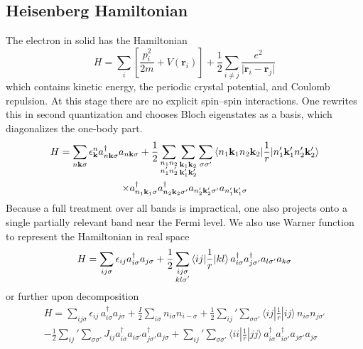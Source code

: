 \documentclass[../../../main.tex]{subfiles}
\begin{document}
\subsection{Heisenberg Hamiltonian}
The electron in solid has the Hamiltonian
\begin{equation*}
    H = \sum_{i}\left[\frac{p_i^2}{2m}+V(\mathbf{r}_i)\right]+\frac{1}{2}\sum_{i\neq j}\frac{e^2}{\lvert\mathbf{r}_i-\mathbf{r}_j\rvert}
\end{equation*}
which contains kinetic energy, the periodic crystal potential, and Coulomb repulsion. At this stage there are no explicit spin–spin interactions.
One rewrites this in second quantization and chooses Bloch eigenstates as a basis, which diagonalizes the one-body part.
\begin{multline*}
    H = \sum_{n\mathbf{k}  \sigma} \epsilon_{\mathbf{k }} ^{n} a^\dagger_{n\mathbf{k}  \sigma} a_{n \mathbf{k} \sigma} +   \frac{1}{2}\sum_{\substack{n_1 n_2                                                                                                                             \\ n_1' n_2'}}\sum_{\substack{\mathbf{k}_1 \mathbf{k}_2 \\ \mathbf{k}_1' \mathbf{k}_2'}}\sum_{\sigma\sigma'}
    \braket{n_1 \mathbf{k}_1  n_2 \mathbf{k}_2  | \frac{1}{r} |  n_1' \mathbf{k}_1' n_2'\mathbf{k}_2'   }\\
    \times     a^\dagger_{n_1\mathbf{k}_1  \sigma} a^\dagger_{n_2 \mathbf{k}_2  \sigma'} a_{ n_2'\mathbf{k}_2'  \sigma'}a_{n_1' \mathbf{k}_1'  \sigma}
\end{multline*}
Because a full treatment over all bands is impractical, one also projects onto a single partially relevant band near the Fermi level.
We also use Warner function to represent the Hamiltonian in real space
\begin{equation*}
    H =  \sum_{ij \sigma} \epsilon_{ij} a ^\dagger_{i \sigma} a_{j \sigma}  +
    \frac{1}{2}\sum_{\substack{i j \sigma \\ k l \sigma'}}
    \braket{ i   j  | \frac{1}{r} |   k l   }
    a^\dagger_{ i  \sigma} a^\dagger_{  j  \sigma'} a_{l  \sigma'}a_{  k  \sigma}
\end{equation*}
or further upon decomposition
\begin{multline*}
    H = \sum_{ij\sigma} \epsilon_{ij}\,a_{i\sigma}^{\dagger}a_{j\sigma}
    + \frac{I}{2}\sum_{i\sigma}n_{i\sigma}n_{i-\sigma}
    + \frac{1}{2}\sum_{ij}^{ }{} '  \sum_{\sigma\sigma'}\langle ij|\frac{1}{r}|ij\rangle\,n_{i\sigma}n_{j\sigma'}\\
    -\frac{1}{2}\sum_{ij}{}' \sum_{\sigma\sigma'}J_{ij}a_{i\sigma}^{\dagger}a_{i\sigma'}a_{j\sigma'}^{\dagger}a_{j\sigma}
    + \sum_{ij} {} ' \sum_{\sigma\sigma'}\langle ii|\frac{1}{r}|jj\rangle\,a_{i\sigma}^{\dagger}a_{i\sigma'}^{\dagger}a_{j\sigma'}a_{j\sigma}
\end{multline*}
\end{document}
